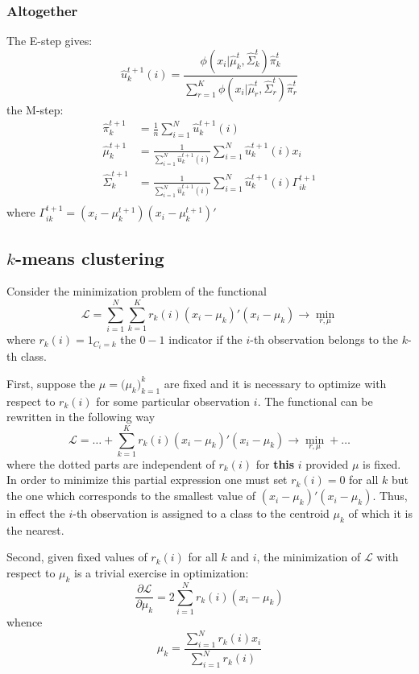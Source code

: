 \documentclass[a4paper]{article}
\newcommand{\Lcal}{\mathcal{L}}
\begin{document}

\subsubsection*{Altogether} %
\label{ssub:altogether}

The E-step gives:
\[
\hat{u}_k^{t+1}(i)
= \frac{\phi(x_i\lvert \hat{\mu}_k^t, \hat{\Sigma}_k^t) \hat{\pi}_k^t}
	{\sum_{r=1}^K \phi(x_i\lvert \hat{\mu}_r^t, \hat{\Sigma}_r^t) \hat{\pi}_r^t}
\]
the M-step:
\begin{align*}
	\hat{\pi}_k^{t+1}
		&= \frac{1}{n} \sum_{i=1}^N \hat{u}_k^{t+1}(i)\\
	\hat{\mu}_k^{t+1}
		&= \frac{1}{\sum_{i=1}^N \hat{u}_k^{t+1}(i)} \sum_{i=1}^N \hat{u}_k^{t+1}(i) x_i\\
	\hat{\Sigma}_k^{t+1}
		&= \frac{1}{\sum_{i=1}^N \hat{u}_k^{t+1}(i)} \sum_{i=1}^N \hat{u}_k^{t+1}(i) \Gamma_{ik}^{t+1}\\
\end{align*}
where $\Gamma_{ik}^{t+1} = (x_i-\mu_k^{t+1}) (x_i-\mu_k^{t+1})'$


\subsection*{$k$-means clustering} %
\label{sub:k_means_clustering}

Consider the minimization problem of the functional
\[ \Lcal = \sum_{i=1}^N \sum_{k=1}^K r_k(i) (x_i-\mu_k)' (x_i-\mu_k) \to \min_{r, \mu} \]
where $r_k(i) = 1_{C_i=k}$ the $0-1$ indicator if the $i$-th observation belongs
to the $k$-th class.

First, suppose the $\mu=\bigl(\mu_k\bigr)_{k=1}^k$ are fixed and it is necessary
to optimize with respect to $r_k(i)$ for some particular observation $i$. The
functional can be rewritten in the following way
\[\Lcal = \ldots + \sum_{k=1}^K r_k(i) (x_i-\mu_k)' (x_i-\mu_k) \to \min_{r, \mu} + \ldots \]
where the dotted parts are independent of $r_k(i)$ for \textbf{this} $i$
provided $\mu$ is fixed.
In order to minimize this partial expression one must set $r_k(i)=0$ for all $k$
but the one which corresponds to the smallest value of $(x_i-\mu_k)' (x_i-\mu_k)$.
Thus, in effect the $i$-th observation is assigned to a class to the centroid $\mu_k$
of which it is the nearest.

Second, given fixed values of $r_k(i)$ for all $k$ and $i$, the minimization of
$\Lcal$ with respect to $\mu_k$ is a trivial exercise in optimization:
\[\frac{\partial \Lcal}{\partial \mu_k} = 2 \sum_{i=1}^N r_k(i) (x_i-\mu_k)\]
whence
\[\mu_k = \frac{\sum_{i=1}^N r_k(i) x_i}{\sum_{i=1}^N r_k(i)}\]
\end{document}
